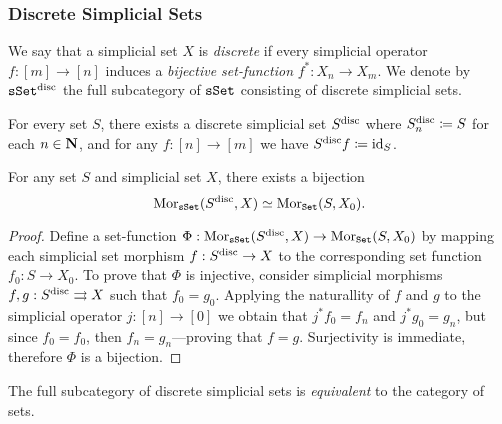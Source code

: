 \subsubsection{Discrete Simplicial Sets}

\begin{definition}
\label{def:discrete-simplicial-set}
We say that a simplicial set \(X\) is \emph{discrete} if every simplicial
operator \(f: [m] \to [n]\) induces a \emph{bijective set-function}
\(f^{*}: X_n \to X_m\). We denote by \(\sSet^{\disc}\) the full subcategory of
\({\texttt{sSet}}\) consisting of discrete simplicial sets.

For every set \(S\), there exists a discrete simplicial set \(S^{\text{disc}}\) where
\(S_n^{\text{disc}} \coloneq S\) for each \(n \in \mathbf{N}\), and for any \(f: [n] \to [m]\)
we have \(S^{\text{disc}} f \coloneq \operatorname{id}_S\).
\end{definition}

\begin{corollary}
\label{cor:bijection-discrete-simplicial-set-and-set-functions}
For any set \(S\) and simplicial set \(X\), there exists a bijection
\[
\operatorname{Mor}_{{\texttt{sSet}}}(S^{\text{disc}}, X) \simeq \operatorname{Mor}_{{\texttt{Set}}}(S, X_0).
\]
\end{corollary}

\begin{proof}
Define a set-function
\(\Phi: \operatorname{Mor}_{{\texttt{sSet}}}(S^{\text{disc}}, X) \to \operatorname{Mor}_{{\texttt{Set}}}(S, X_0)\) by mapping each
simplicial set morphism \(f: S^{\text{disc}} \to X\) to the corresponding set function
\(f_0: S \to X_0\). To prove that \(\Phi\) is injective, consider simplicial
morphisms \(f, g: S^{\text{disc}} \rightrightarrows X\) such that \(f_0 = g_0\). Applying the
naturallity of \(f\) and \(g\) to the simplicial operator \(j: [n] \to [0]\) we
obtain that \(j^{*} f_0 = f_n\) and \(j^{*} g_0 = g_n\), but since
\(f_0 = f_0\), then \(f_n = g_n\)---proving that \(f = g\). Surjectivity is
immediate, therefore \(\Phi\) is a bijection.
\end{proof}

\begin{proposition}[\(\sSet^{\disc}\) \& \(\Set\)]
\label{prop:sSet-disc-equivalent-to-Set}
The full subcategory of discrete simplicial sets is \emph{equivalent} to the
category of sets.
\end{proposition}

